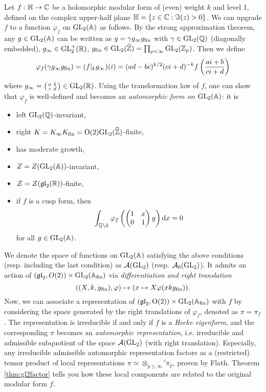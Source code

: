 Let $f : \mathbb{H} \to \mathbb{C}$ be a holomorphic modular form of (even) weight $k$ and level 1, defined on the complex upper-half plane $\mathbb{H} = \{z  \in \mathbb{C}: \Im (z) > 0\}$.
We can upgrade $f$ to a function $\varphi_f$ on $\mathrm{GL}_2(\mathbb{A})$ as follows.
By the strong approximation theorem, any $g \in \mathrm{GL}_2(\mathbb{A})$ can be written as $g = \gamma g_\infty g_{\mathrm{fin}}$ with $\gamma \in \mathrm{GL}_2(\mathbb{Q})$ (diagonally embedded), $g_\infty \in \mathrm{GL}_2^+(\mathbb{R})$, $g_{\mathrm{fin}} \in \mathrm{GL}_2(\widehat{\mathbb{Z}}) = \prod_{p < \infty} \mathrm{GL}_2(\mathbb{Z}_p)$.
Then we define
$$
\varphi_f(\gamma g_\infty g_{\mathrm{fin}}) = (f|_k g_\infty)(i) = (ad - bc)^{k/2} (ci + d)^{-k} f\left(\frac{ai + b}{ci + d}\right)
$$
where $g_\infty = \left(\begin{smallmatrix}
    a & b \\ c & d
\end{smallmatrix}\right) \in \mathrm{GL}_2(\mathbb{R})$.
Using the transformation law of $f$, one can show that $\varphi_f$ is well-defined and becomes an \emph{automorphic form on $\mathrm{GL}_2(\mathbb{A})$}: it is
\begin{itemize}
    \item left $\mathrm{GL}_2(\mathbb{Q})$-invariant,
    \item right $K = K_\infty K_{\mathrm{fin}} = \mathrm{O}(2) \mathrm{GL}_2(\widehat{\mathbb{Z}})$-finite,
    \item has moderate growth,
    \item $Z = Z(\mathrm{GL}_2(\mathbb{A}))$-invariant,
    \item $\mathcal{Z} = \mathcal{Z}(\mathfrak{gl}_2(\mathbb{R}))$-finite,
    \item if $f$ is a cusp form, then
    $$
        \int_{\mathbb{Q} \backslash \mathbb{A}} \varphi_f \left(\begin{pmatrix}
            1 & x \\ 0 & 1
        \end{pmatrix}g\right) \mathrm{d} x = 0
    $$
    for all $g \in \mathrm{GL}_2(\mathbb{A})$.
\end{itemize}
We denote the space of functions on $\mathrm{GL}_2(\mathbb{A})$ satisfying the above conditions (resp. including the last condition) as $\mathcal{A}(\mathrm{GL}_2)$ (resp. $\mathcal{A}_0(\mathrm{GL}_2)$).
It admits an action of $(\mathfrak{gl}_2, O(2)) \times \mathrm{GL}_2(\mathbb{A}_{\mathrm{fin}})$ via \emph{differentiation and right translation}
$$
    ((X, k, g_{\mathrm{fin}}), \varphi) \mapsto (x \mapsto X \varphi(xkg_{\mathrm{fin}})).
$$
Now, we can associate a representation of $(\mathfrak{gl}_2, \mathrm{O}(2)) \times \mathrm{GL}_2(\mathbb{A}_{\mathrm{fin}})$ with $f$ by considering the space generated by the right translations of $\varphi_f$, denoted as $\pi = \pi_f$.
The representation is irreducible if and only if $f$ is a \emph{Hecke eigenform}, and the corresponding $\pi$ becomes an \emph{automorphic representation}, i.e. irreducible and admissible subquotient of the space $\mathcal{A}(\mathrm{GL}_2)$ (with right translation).
Especially, any irreducible admissible automorphic representation factors as a (restricted) tensor product of local representations $\pi \simeq \otimes_{p \le \infty}' \pi_p$, proven by Flath.
Theorem \ref{thm:gl2factor} tells you how these local components are related to the original modular form $f$.


